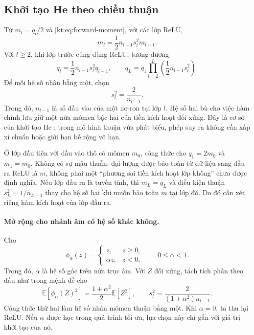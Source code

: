 \subsection{Khởi tạo He theo chiều thuận}

Từ $m_l=q_l/2$ và \eqref{kt:eq:forward-moment}, với các lớp ReLU,
\begin{equation}
 m_l=\frac12n_{l-1}s_l^2m_{l-1}.
 \label{kt:eq:he-forward-m}
\end{equation}
Với $l\geq2$, khi lớp trước cũng dùng ReLU, tương đương
\begin{equation}
 q_l=\frac12n_{l-1}s_l^2q_{l-1},\qquad
 q_L=q_1\prod_{l=2}^{L}\left(\frac12n_{l-1}s_l^2\right).
 \label{kt:eq:he-forward-q}
\end{equation}
Để mỗi hệ số nhân bằng một, chọn
\begin{equation}
 \boxed{s_l^2=\frac2{n_{l-1}}.}
 \label{kt:eq:he-in}
\end{equation}
Trong đó, $n_{l-1}$ là số đầu vào của một nơ-ron tại lớp $l$.
Hệ số hai bù cho việc hàm chỉnh lưu giữ một nửa mômen bậc hai của
tiền kích hoạt đối xứng. Đây là cơ sở của khởi tạo He
\cite{he2015}; trong mô hình thuận vừa phát biểu, phép suy ra
không cần xấp xỉ chuẩn hoặc giới hạn bề rộng vô hạn.

Ở lớp đầu tiên với đầu vào thô có mômen $m_0$, công thức cho
$q_1=2m_0$ và $m_1=m_0$. Không có sự mâu thuẫn: đại lượng được
bảo toàn từ dữ liệu sang đầu ra ReLU là $m$, không phải một
``phương sai tiền kích hoạt lớp không'' chưa được định nghĩa.
Nếu lớp đầu ra là tuyến tính, thì $m_L=q_L$ và điều kiện thuận
$s_L^2=1/n_{L-1}$ thay cho hệ số hai khi muốn bảo toàn $m$ tại
lớp đó. Do đó cần xét riêng hàm kích hoạt của lớp đầu ra.

\paragraph{Mở rộng cho nhánh âm có hệ số khác không.}
Cho
\begin{equation}
 \phi_\alpha(z)=
 \begin{cases}z,&z\geq0,\\\alpha z,&z<0,\end{cases}
 \qquad 0\leq\alpha<1.
 \label{kt:eq:leaky}
\end{equation}
Trong đó, $\alpha$ là hệ số góc trên nửa trục âm. Với $Z$ đối
xứng, tách tích phân theo dấu như trong mệnh đề cho
\begin{equation}
 \mathbb E[\phi_\alpha(Z)^2]
   =\frac{1+\alpha^2}{2}\mathbb E[Z^2],\qquad
 s_l^2=\frac{2}{(1+\alpha^2)n_{l-1}}.
 \label{kt:eq:leaky-init}
\end{equation}
Công thức thứ hai làm hệ số nhân mômen thuận bằng một. Khi
$\alpha=0$, ta thu lại ReLU. Nếu $\alpha$ được học trong quá
trình tối ưu, lựa chọn này chỉ gắn với giá trị khởi tạo của nó.

